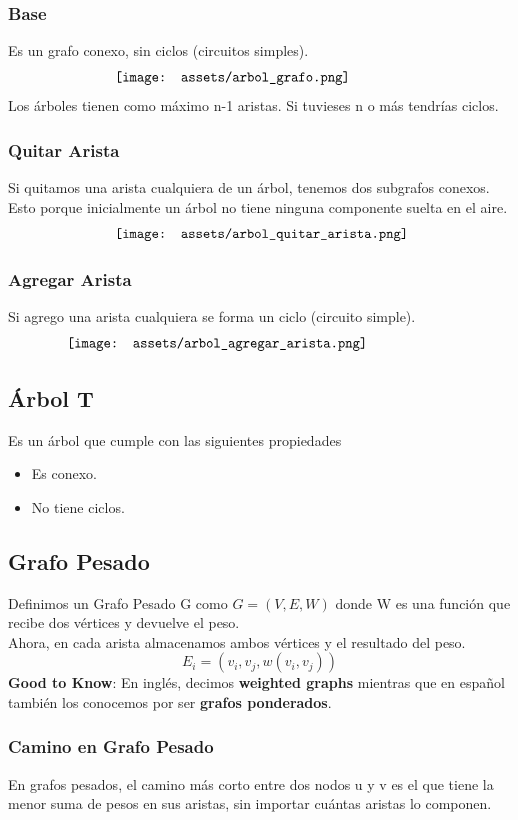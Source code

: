\documentclass[10pt,a4paper]{article}
\begin{document}
\subsubsection*{Base}
Es un grafo conexo, sin ciclos (circuitos simples).
\[\begin{minipage}[b]{0.6\textwidth}
    \texttt{[image: assets/arbol\_grafo.png]}
\end{minipage}\]
Los árboles tienen como máximo n-1 aristas. Si tuvieses n o más tendrías ciclos.
\subsubsection*{Quitar Arista}
Si quitamos una arista cualquiera de un árbol, tenemos dos subgrafos conexos. Esto porque inicialmente un árbol no tiene ninguna componente suelta en el aire. 
\[\begin{minipage}[b]{0.6\textwidth}
    \texttt{[image: assets/arbol\_quitar\_arista.png]}
\end{minipage}\]
\subsubsection*{Agregar Arista}
Si agrego una arista cualquiera se forma un ciclo (circuito simple).
\[\begin{minipage}[b]{0.8\textwidth}
    \texttt{[image: assets/arbol\_agregar\_arista.png]}
\end{minipage}\]
\subsection*{Árbol T}
Es un árbol que cumple con las siguientes propiedades
\begin{itemize}
    \item Es conexo.
    \item No tiene ciclos. 
\end{itemize}
\subsection*{Grafo Pesado}
Definimos un Grafo Pesado G como $G = (V, E, W)$ donde W es una función que recibe dos vértices y devuelve el peso. \\
Ahora, en cada arista almacenamos ambos vértices y el resultado del peso. 
\[E_{i} = (v_{i}, v_{j}, w(v_{i},v_{j}))\]
\textbf{Good to Know}: En inglés, decimos \textbf{weighted graphs} mientras que en español también los conocemos por ser \textbf{grafos ponderados}.
\subsubsection*{Camino en Grafo Pesado}
En grafos pesados, el camino más corto entre dos nodos u y v es el que tiene la menor suma de pesos en sus aristas, sin importar cuántas aristas lo componen.
\end{document}
